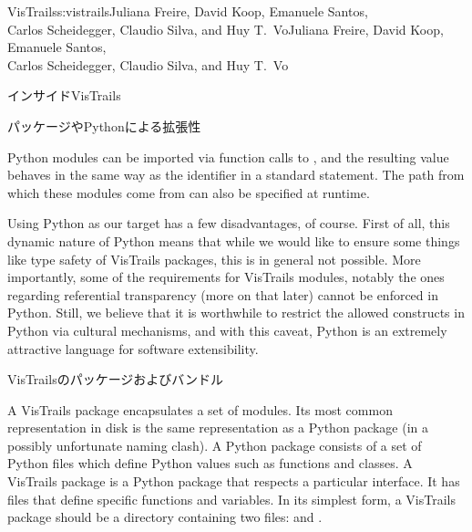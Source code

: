 \begin{aosachaptertoc}{VisTrails}{s:vistrails}{Juliana Freire, David Koop, Emanuele Santos, \\ Carlos Scheidegger, Claudio Silva, and Huy T.\ Vo}{Juliana Freire, David Koop, Emanuele Santos, \\ \hspace*{0.9cm} Carlos Scheidegger, Claudio Silva, and Huy T.\ Vo}
\begin{aosasect1}{インサイドVisTrails}
\begin{aosasect2}{パッケージやPythonによる拡張性}
\begin{aosaitemize}
  \item Python modules can be imported via function calls to
  , and the resulting value behaves in the same
  way as the identifier in a standard  statement. The
  path from which these modules come from can also be specified at runtime.

\end{aosaitemize}

Using Python as our target has a few disadvantages, of course. First
of all, this dynamic nature of Python means that while we would like
to ensure some things like type safety of VisTrails packages, this is
in general not possible.  More importantly, some of the requirements
for VisTrails modules, notably the ones regarding referential
transparency (more on that later) cannot be enforced in Python. Still,
we believe that it is worthwhile to restrict the allowed constructs in
Python via cultural mechanisms, and with this caveat, Python is an
extremely attractive language for software extensibility.

\end{aosasect2}

\begin{aosasect2}{VisTrailsのパッケージおよびバンドル}

A VisTrails package encapsulates a set of modules. Its most
common representation in disk is the same representation as a Python
package (in a possibly unfortunate naming clash). A Python package
consists of a set of Python files which define Python values such as
functions and classes. A VisTrails package is a Python package that
respects a particular interface. It has files that define specific
functions and variables. In its simplest form, a VisTrails package
should be a directory containing two files:  and
.


\end{aosasect2}
\end{aosasect1}
\end{aosachaptertoc}
